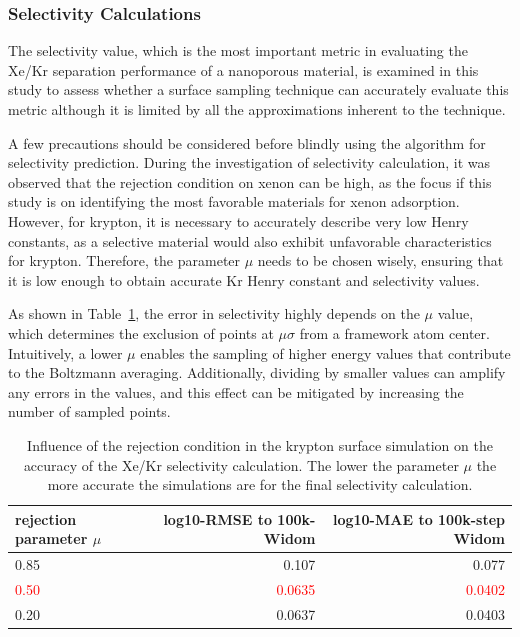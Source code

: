 \documentclass[main]{subfiles}
\begin{document}
\subsubsection{Selectivity Calculations}

The selectivity value, which is the most important metric in evaluating the Xe/Kr separation performance of a nanoporous material, is examined in this study to assess whether a surface sampling technique can accurately evaluate this metric although it is limited by all the approximations inherent to the technique. 

A few precautions should be considered before blindly using the algorithm for selectivity prediction. During the investigation of selectivity calculation, it was observed that the rejection condition on xenon can be high, as the focus if this study is on identifying the most favorable materials for xenon adsorption. However, for krypton, it is necessary to accurately describe very low Henry constants, as a selective material would also exhibit unfavorable characteristics for krypton. Therefore, the parameter $\mu$ needs to be chosen wisely, ensuring that it is low enough to obtain accurate Kr Henry constant and selectivity values. 

As shown in Table~\ref{tab:selec_prob}, the error in selectivity highly depends on the $\mu$ value, which determines the exclusion of points at $\mu\sigma$ from a framework atom center. Intuitively, a lower $\mu$ enables the sampling of higher energy values that contribute to the Boltzmann averaging. Additionally, dividing by smaller values can amplify any errors in the values, and this effect can be mitigated by increasing the number of sampled points.

\begin{table}[ht]
  \setlength{\extrarowheight}{1pt}
  \centering
  \begin{tabular}{|l|r|r|}
  \hline
    rejection parameter $\mu$ &  log10-RMSE to 100k-Widom &   log10-MAE to 100k-step Widom \\
  \hline
      0.85 &      0.107 &   0.077 \\
      \textcolor{red}{0.50} &      \textcolor{red}{0.0635} &   \textcolor{red}{0.0402} \\
      0.20 &      0.0637 &   0.0403 \\
  \hline
  \end{tabular}
  \caption{Influence of the rejection condition in the krypton surface simulation on the accuracy of the Xe/Kr selectivity calculation. The lower the parameter $\mu$ the more accurate the simulations are for the final selectivity calculation.}\label{tab:selec_prob}
\end{table}
\end{document}
